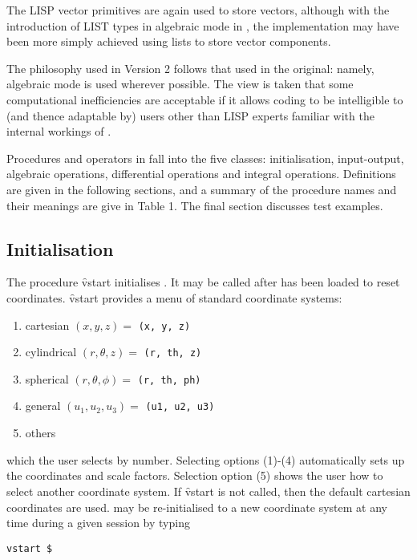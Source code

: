 The LISP vector primitives are again used to store vectors, although 
with the introduction of LIST types in algebraic mode in , the implementation may have been more simply achieved 
using lists to store vector components.

The philosophy used in Version 2 follows that used in the original:
namely, algebraic mode is used wherever possible.  The view is taken
that some computational inefficiencies are acceptable if it allows
coding to be intelligible to (and thence adaptable by) users other
than LISP experts familiar with the internal workings of \REDUCE.

Procedures and operators in  fall into the five classes: 
initialisation, input-output, algebraic operations, differential
operations and integral operations.  Definitions are given in 
the following sections, and
a summary of the procedure names and their meanings are give in Table 1.
The final section discusses test examples.

\subsection{Initialisation}\label{vstart}
\hypertarget{command:VSTART}{}
The procedure \f{vstart} initialises .  It may be
called after  has been loaded to reset coordinates.
\f{vstart} provides a
menu of standard coordinate systems:

\begin{enumerate}
\item cartesian $(x, y, z) = $ \texttt{(x, y, z)}
\item cylindrical $(r, \theta, z) = $ \texttt{(r, th, z)}
\item spherical $(r, \theta, \phi) = $ \texttt{(r, th, ph) }
\item general $( u_1, u_2, u_3 ) = $ \texttt{(u1, u2, u3) }
\item others
\end{enumerate}

which the user selects by number.  Selecting options (1)-(4)
automatically sets up the coordinates and scale factors.  Selection
option (5) shows the user how to select another coordinate system.  If
\f{vstart} is not called, then the default cartesian coordinates are used.
 may be re-initialised to a new coordinate system at any time
during a given \REDUCE session by typing
\begin{verbatim}
vstart $
\end{verbatim}

